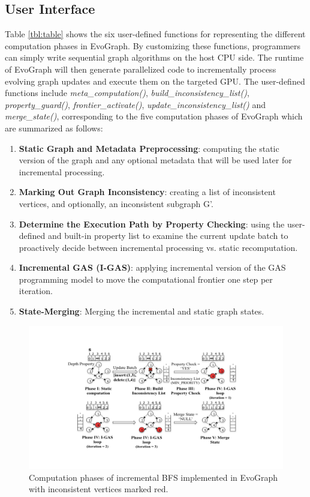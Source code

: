 \subsection{User Interface}
Table \ref{tbl:table} shows the six user-defined functions for representing the different computation phases in EvoGraph. By customizing these functions, programmers can simply write sequential graph algorithms on the host CPU side. The runtime of EvoGraph will then generate parallelized code to incrementally process evolving graph updates and execute them on the targeted GPU. The user-defined functions include \textit{meta\_computation()}, \textit{build\_inconsistency\_list()}, \textit{property\_guard()}, \textit{frontier\_activate()}, \textit{update\_inconsistency\_list()} and \textit{merge\_state()}, corresponding to the five computation phases of EvoGraph which are summarized as follows: 
\begin{enumerate}
  \item  \textbf{Static Graph and Metadata Preprocessing}: computing the static version of the graph and any optional metadata that will be used later for incremental processing.
  \item \textbf{Marking Out Graph Inconsistency}: creating a list of inconsistent vertices, and optionally, an inconsistent subgraph G'.
  \item \textbf{Determine the Execution Path by Property Checking}: using the user-defined and built-in property list to examine the current update batch to proactively decide between  incremental processing vs. static recomputation.
 \item  \textbf{Incremental GAS (I-GAS)}: applying incremental version of the GAS programming model to move the computational frontier one step per iteration.
 \item   \textbf{State-Merging}: Merging the incremental and static graph states.
\end{enumerate}


\begin{figure}[!t]
\centering
\includegraphics[width=1\columnwidth]{figures/bfs.pdf}
\caption{Computation phases of incremental BFS implemented in EvoGraph with inconsistent vertices marked red.}
\label{fig:bfs}
\end{figure}

